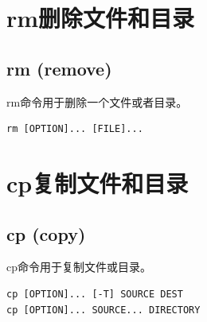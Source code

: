 \documentclass[12pt, openany, oneside]{book}
\begin{document}
\newpage

\section{rm删除文件和目录}

\subsection{rm (remove)}

rm命令用于删除一个文件或者目录。

\vspace{-0.5cm}
\begin{lstlisting}
rm [OPTION]... [FILE]...
\end{lstlisting}

\begin{table}[H]
	\centering
	\caption{rm参数说明}
\end{table}

\newpage

\section{cp复制文件和目录}

\subsection{cp (copy)}

cp命令用于复制文件或目录。

\vspace{-0.5cm}
\begin{lstlisting}
cp [OPTION]... [-T] SOURCE DEST
cp [OPTION]... SOURCE... DIRECTORY
\end{lstlisting}
\end{document}
